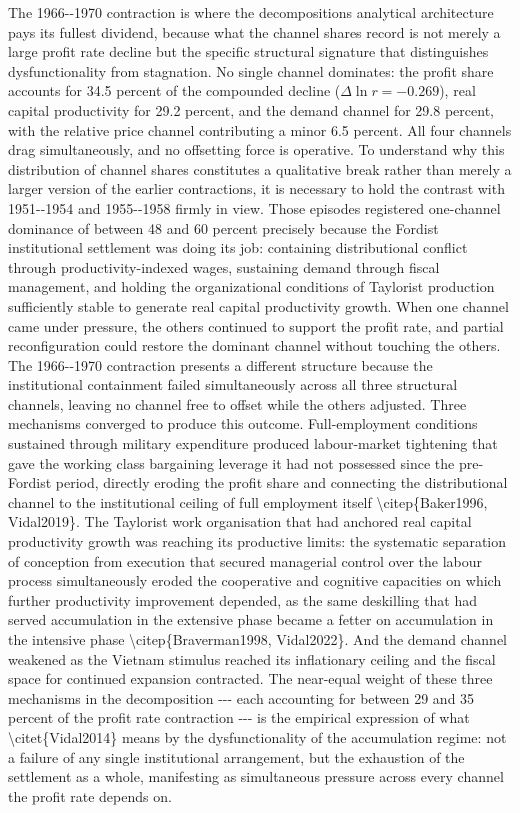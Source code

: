 The 1966-\/-1970 contraction is where the
decomposition\textquotesingle s analytical architecture pays its fullest
dividend, because what the channel shares record is not merely a large
profit rate decline but the specific structural signature that
distinguishes dysfunctionality from stagnation. No single channel
dominates: the profit share accounts for 34.5 percent of the compounded
decline (\(\Delta\ln r = -0.269\)), real capital productivity for 29.2
percent, and the demand channel for 29.8 percent, with the relative
price channel contributing a minor 6.5 percent. All four channels drag
simultaneously, and no offsetting force is operative. To understand why
this distribution of channel shares constitutes a qualitative break
rather than merely a larger version of the earlier contractions, it is
necessary to hold the contrast with 1951-\/-1954 and 1955-\/-1958 firmly
in view. Those episodes registered one-channel dominance of between 48
and 60 percent precisely because the Fordist institutional settlement
was doing its job: containing distributional conflict through
productivity-indexed wages, sustaining demand through fiscal management,
and holding the organizational conditions of Taylorist production
sufficiently stable to generate real capital productivity growth. When
one channel came under pressure, the others continued to support the
profit rate, and partial reconfiguration could restore the dominant
channel without touching the others. The 1966-\/-1970 contraction
presents a different structure because the institutional containment
failed simultaneously across all three structural channels, leaving no
channel free to offset while the others adjusted. Three mechanisms
converged to produce this outcome. Full-employment conditions sustained
through military expenditure produced labour-market tightening that gave
the working class bargaining leverage it had not possessed since the
pre-Fordist period, directly eroding the profit share and connecting the
distributional channel to the institutional ceiling of full employment
itself \textbackslash citep\{Baker1996, Vidal2019\}. The Taylorist work
organisation that had anchored real capital productivity growth was
reaching its productive limits: the systematic separation of conception
from execution that secured managerial control over the labour process
simultaneously eroded the cooperative and cognitive capacities on which
further productivity improvement depended, as the same deskilling that
had served accumulation in the extensive phase became a fetter on
accumulation in the intensive phase \textbackslash citep\{Braverman1998,
Vidal2022\}. And the demand channel weakened as the Vietnam stimulus
reached its inflationary ceiling and the fiscal space for continued
expansion contracted. The near-equal weight of these three mechanisms in
the decomposition -\/-\/- each accounting for between 29 and 35 percent
of the profit rate contraction -\/-\/- is the empirical expression of
what \textbackslash citet\{Vidal2014\} means by the dysfunctionality of
the accumulation regime: not a failure of any single institutional
arrangement, but the exhaustion of the settlement as a whole,
manifesting as simultaneous pressure across every channel the profit
rate depends on.

